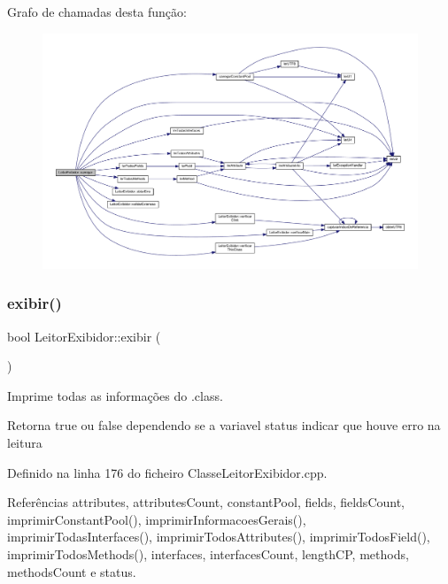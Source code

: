 Grafo de chamadas desta função\+:
\nopagebreak
\begin{figure}[H]
\begin{center}
\leavevmode
\includegraphics[width=350pt]{classLeitorExibidor_a493a9aed1941a4f01c611a2deeb37f8d_cgraph}
\end{center}
\end{figure}
\mbox{\label{classLeitorExibidor_a544bd7574553d9015b22c2507971e7f5}} 
\subsubsection{\texorpdfstring{exibir()}{exibir()}}
{\footnotesize\ttfamily bool Leitor\+Exibidor\+::exibir (\begin{DoxyParamCaption}{ }\end{DoxyParamCaption})}



Imprime todas as informações do .class. 

\begin{DoxyReturn}{Retorna}
true ou false dependendo se a variavel status indicar que houve erro na leitura 
\end{DoxyReturn}


Definido na linha 176 do ficheiro Classe\+Leitor\+Exibidor.\+cpp.



Referências attributes, attributes\+Count, constant\+Pool, fields, fields\+Count, imprimir\+Constant\+Pool(), imprimir\+Informacoes\+Gerais(), imprimir\+Todas\+Interfaces(), imprimir\+Todos\+Attributes(), imprimir\+Todos\+Field(), imprimir\+Todos\+Methods(), interfaces, interfaces\+Count, length\+CP, methods, methods\+Count e status.



